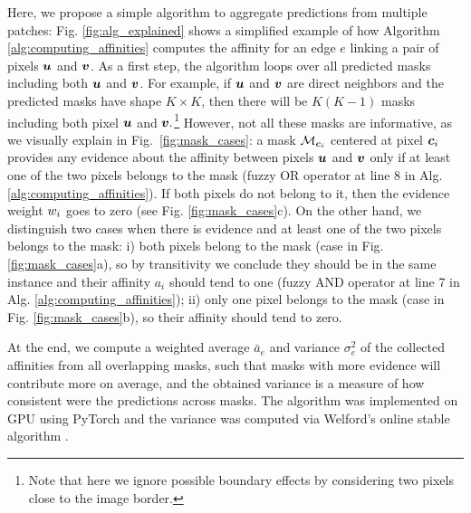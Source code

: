 Here, we propose a simple algorithm to aggregate predictions from multiple patches: Fig. \ref{fig:alg_explained} shows a simplified example of how Algorithm \ref{alg:computing_affinities} computes the affinity for an edge $e$ linking a pair of pixels $\bm{u}$ and $\bm{v}$.
As a first step, the algorithm loops over all predicted \maskname masks including both $\bm{u}$ and $\bm{v}$. For example, if $\bm{u}$ and $\bm{v}$ are direct neighbors and the predicted masks have shape $K\times K$, then there will be $K(K-1)$ masks including both pixel $\bm{u}$ and $\bm{v}.$\footnote{Note that here we ignore possible boundary effects by considering two pixels close to the image border.} 
However, not all these masks are informative, as we visually explain in Fig.~\ref{fig:mask_cases}: a mask $\mathcal{M}_{\bm{c}_i}$ centered at pixel $\bm{c}_i$ provides any evidence about the affinity between pixels $\bm{u}$ and $\bm{v}$ only if at least one of the two pixels belongs to the mask (fuzzy OR operator at line 8 in Alg. \ref{alg:computing_affinities}).
If both pixels do not belong to it, then the evidence weight $w_i$ goes to zero (see Fig. \ref{fig:mask_cases}c).
On the other hand, we distinguish two cases when there is evidence and at least one of the two pixels belongs to the mask: i)
both pixels belong to the mask  (case in Fig. \ref{fig:mask_cases}a), so by transitivity we conclude they should be in the same instance and their affinity $a_i$ should tend to one (fuzzy AND operator at line 7 in Alg. \ref{alg:computing_affinities}); 
ii) only one pixel belongs to the mask (case in Fig. \ref{fig:mask_cases}b), so their affinity should tend to zero. 

At the end, we compute a weighted average $\bar{a}_e$ and variance $\sigma^2_e$ of the collected affinities from all overlapping masks, such that masks with more evidence will contribute more on average, and the obtained variance is a measure of how consistent were the predictions across masks. 
The algorithm was implemented on GPU using PyTorch \cite{NEURIPS2019_9015} and the variance was computed via Welford's online stable algorithm \cite{welford1962note}.




